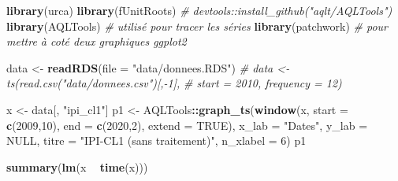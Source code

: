 \documentclass[french]{article}
\newenvironment{Shaded}{\begin{snugshade}}{\end{snugshade}}
\newcommand{\CommentTok}[1]{\textcolor[rgb]{0.56,0.35,0.01}{\textit{#1}}}
\newcommand{\DataTypeTok}[1]{\textcolor[rgb]{0.13,0.29,0.53}{#1}}
\newcommand{\DecValTok}[1]{\textcolor[rgb]{0.00,0.00,0.81}{#1}}
\newcommand{\KeywordTok}[1]{\textcolor[rgb]{0.13,0.29,0.53}{\textbf{#1}}}
\newcommand{\NormalTok}[1]{#1}
\newcommand{\OperatorTok}[1]{\textcolor[rgb]{0.81,0.36,0.00}{\textbf{#1}}}
\newcommand{\OtherTok}[1]{\textcolor[rgb]{0.56,0.35,0.01}{#1}}
\newcommand{\StringTok}[1]{\textcolor[rgb]{0.31,0.60,0.02}{#1}}
\begin{document}
\begin{Shaded}
\begin{Highlighting}[]
\KeywordTok{library}\NormalTok{(urca)}
\KeywordTok{library}\NormalTok{(fUnitRoots)}
\CommentTok{# devtools::install_github("aqlt/AQLTools")}
\KeywordTok{library}\NormalTok{(AQLTools) }\CommentTok{# utilisé pour tracer les séries}
\KeywordTok{library}\NormalTok{(patchwork) }\CommentTok{# pour mettre à coté deux graphiques ggplot2}

\NormalTok{data <-}\StringTok{ }\KeywordTok{readRDS}\NormalTok{(}\DataTypeTok{file =} \StringTok{"data/donnees.RDS"}\NormalTok{)}
\CommentTok{# data <- ts(read.csv("data/donnees.csv")[,-1],}
\CommentTok{#          start = 2010, frequency = 12)}


\NormalTok{x <-}\StringTok{ }\NormalTok{data[, }\StringTok{"ipi_cl1"}\NormalTok{]}
\NormalTok{p1 <-}\StringTok{ }\NormalTok{AQLTools}\OperatorTok{::}\KeywordTok{graph_ts}\NormalTok{(}\KeywordTok{window}\NormalTok{(x,}
                                \DataTypeTok{start =} \KeywordTok{c}\NormalTok{(}\DecValTok{2009}\NormalTok{,}\DecValTok{10}\NormalTok{),}
                                \DataTypeTok{end =} \KeywordTok{c}\NormalTok{(}\DecValTok{2020}\NormalTok{,}\DecValTok{2}\NormalTok{),}
                                \DataTypeTok{extend =} \OtherTok{TRUE}\NormalTok{), }\DataTypeTok{x_lab =} \StringTok{"Dates"}\NormalTok{, }\DataTypeTok{y_lab =} \OtherTok{NULL}\NormalTok{,}
                         \DataTypeTok{titre =} \StringTok{"IPI-CL1 (sans traitement)"}\NormalTok{, }\DataTypeTok{n_xlabel =} \DecValTok{6}\NormalTok{)}
\NormalTok{p1}

\KeywordTok{summary}\NormalTok{(}\KeywordTok{lm}\NormalTok{(x }\OperatorTok{~}\StringTok{ }\KeywordTok{time}\NormalTok{(x)))}


\end{Highlighting}
\end{Shaded}
\end{document}
